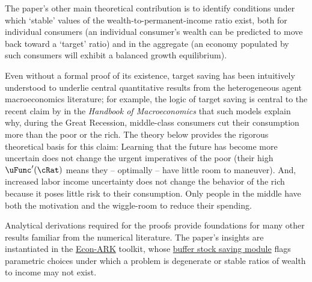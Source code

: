 \documentclass[BufferStockTheory]{subfiles}
\begin{document}
The paper's other main theoretical contribution is to identify conditions under which `stable' values of the wealth-to-permanent-income ratio exist, both for individual consumers (an individual consumer's wealth can be predicted to move back toward a `target' ratio) and in the aggregate (an economy populated by such consumers will exhibit a balanced growth equilibrium).  %

\hypertarget{KMP}{} 

Even without a formal proof of its existence, target saving has been intuitively understood to underlie central quantitative results from the heterogeneous agent macroeconomics literature; for example, the logic of target saving is central to the recent claim by \cite{kmpHandbook} in the \textit{Handbook of Macroeconomics} that such models explain why, during the Great Recession, middle-class consumers cut their consumption more than the poor or the rich.  The theory below provides the rigorous theoretical basis for this claim:  Learning that the future has become more uncertain does not change the urgent imperatives of the poor (their high $\uFunc^{\prime}(\cRat)$ means they -- optimally -- have little room to maneuver).  And, increased labor income uncertainty does not change the behavior of the rich because it poses little risk to their consumption.  Only people in the middle have both the motivation and the wiggle-room to reduce their spending.%

Analytical derivations required for the proofs provide foundations for many other results familiar from the numerical literature.  The paper's insights are instantiated in the \href{https://econ-ark.org}{Econ-ARK} toolkit, whose \href{https://hark.readthedocs.io/en/stable/reference/ConsumptionSaving/ConsIndShockModel.html}{buffer stock saving module} flags parametric choices under which a problem is degenerate or stable ratios of wealth to income may not exist.%
\end{document}
